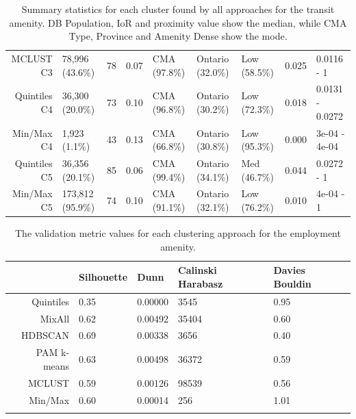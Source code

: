 \documentclass[11pt, a4paper]{article}
\begin{document}
\begin{table}[H]
{\begin{tabular}{|r|llllllll|}
  MCLUST C3 & 78,996 (43.6\%) & 78 & 0.07 & CMA (97.8\%) & Ontario (32.0\%) & Low (58.5\%) & 0.025 & 0.0116 - 1 \\ 
  Quintiles C4 & 36,300 (20.0\%) & 73 & 0.10 & CMA (96.8\%) & Ontario (30.2\%) & Low (72.3\%) & 0.018 & 0.0131 - 0.0272 \\ 
  Min/Max C4 & 1,923 (1.1\%) & 43 & 0.13 & CMA (66.8\%) & Ontario (30.8\%) & Low (95.3\%) & 0.000 & 3e-04 - 4e-04 \\ 
  Quintiles C5 & 36,356 (20.1\%) & 85 & 0.06 & CMA (99.4\%) & Ontario (34.1\%) & Med (46.7\%) & 0.044 & 0.0272 - 1 \\ 
  Min/Max C5 & 173,812 (95.9\%) & 74 & 0.10 & CMA (91.1\%) & Ontario (32.1\%) & Low (76.2\%) & 0.010 & 4e-04 - 1 \\ 
   \hline
\end{tabular}
}
\caption[Transit cluster profiles]{Summary statistics for each cluster found by all approaches for the transit amenity. DB Population, IoR and proximity value show the median, while CMA Type, Province and Amenity Dense show the mode.}\label{transitprofiles}
\end{table}










\centering
\begin{longtable}[H]{|r|llll|}
  \hline
 & Silhouette & Dunn & Calinski Harabasz & Davies Bouldin \\ 
  \hline
Quintiles & 0.35 & 0.00000 &  3545 & 0.95 \\ 
   \hline
MixAll & 0.62 & 0.00492 & 35404 & 0.60 \\ 
   \hline
HDBSCAN & 0.69 & 0.00338 &  3656 & 0.40 \\ 
   \hline
PAM k-means & 0.63 & 0.00498 & 36372 & 0.59 \\ 
   \hline
MCLUST & 0.59 & 0.00126 & 98539 & 0.56 \\ 
   \hline
Min/Max & 0.60 & 0.00014 &   256 & 1.01 \\ 
   \hline
\caption[Employment validation metrics]{The validation metric values for each clustering approach for the employment amenity.}\label{employmentvalid}
\end{longtable}
\end{document}
